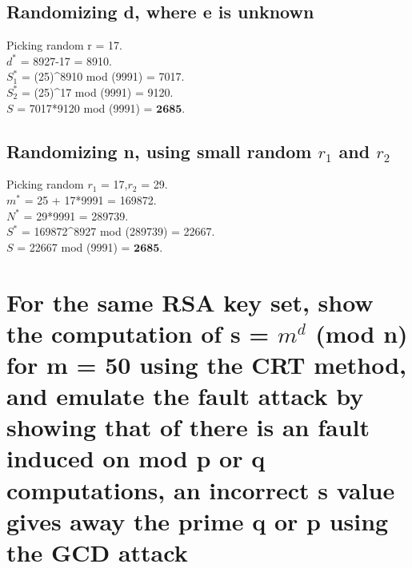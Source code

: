 \documentclass[11pt, pdftex]{article}
\begin{document}
\subsection{Randomizing d, where e is unknown}
Picking random r = 17.\\
$d^{*}$ = 8927-17 = 8910.\\
$S_{1}^{*}$ = (25)^{8910} mod (9991) = 7017. \\
$S_{2}^{*}$ = (25)^{17} mod (9991) = 9120. \\
$S$ = 7017*9120 mod (9991) = $\textbf{2685}$. 
\subsection{Randomizing n, using small random $r_{1}$ and $r_{2}$}
Picking random $r_{1}$ = 17,$r_{2}$ = 29.\\
$m^{*}$ = 25 + 17*9991 = 169872.\\
$N^{*}$ = 29*9991 = 289739.\\
$S^{*}$ = 169872^{8927} mod (289739) = 22667.\\
$S$ = 22667 mod (9991) = $\textbf{2685}$.
\section{For the same RSA key set, show the computation of s = $m^{d}$ (mod n) for m = 50 using the CRT method, and emulate the fault attack by showing that of there is an fault induced on mod p or q computations, an incorrect s value gives away the prime q or p using the GCD attack}
\end{document}
